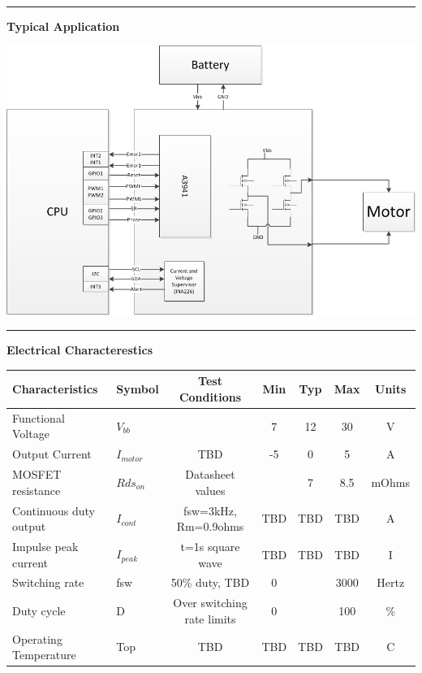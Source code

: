 \documentclass{article}
\begin{document}
\\
\hspace{0.3in}
\hrule
\hspace{0.3in}
\begin{center} 
\large{\textbf{Typical Application}}
\end{center}
\begin{center}
\includegraphics[width=6in]{CB01_block.png}
\end{center}
\hrule
\newpage
\large{\textbf{Electrical Characterestics}} \\
\begin{center}
\begin{tabular}{|l | l |c| c|c|c|c|}
\hline
Characteristics & Symbol &Test Conditions & Min & Typ & Max & Units \\ \hline
Functional Voltage& $V_{bb}$& & 7&12&30&V \\ \hline 
Output Current & $I_{motor}$ & TBD& -5 & 0& 5 &A \\ \hline
MOSFET resistance & $Rds_{on}$  & Datasheet values& & 7 & 8.5 & mOhms\\\hline
Continuous duty output &$I_{cont}$ & fsw=3kHz, Rm=0.9ohms& TBD&TBD&TBD& A\\ \hline
Impulse peak current& $I_{peak}$& t=1s square wave& TBD& TBD& TBD&I \\ \hline
Switching rate &fsw & 50\% duty, TBD &0&&3000& Hertz\\  \hline
Duty cycle &D& Over switching rate limits& 0&&100&\% \\ \hline
Operating Temperature& Top& TBD& TBD& TBD&TBD&C \\\hline

\hline
\end{tabular}
\end{center}
\end{document}
